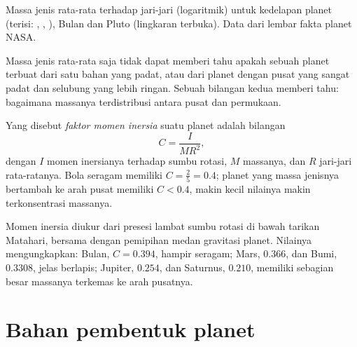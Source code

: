 \begin{omfigure}
{\small Massa jenis rata-rata terhadap jari-jari (logaritmik) untuk kedelapan planet (terisi: , , ), Bulan dan Pluto (lingkaran terbuka). Data dari lembar fakta planet NASA.}
\end{omfigure}

Massa jenis rata-rata saja tidak dapat memberi tahu apakah sebuah planet terbuat dari satu bahan yang padat, atau dari planet dengan pusat yang sangat padat dan selubung yang lebih ringan. Sebuah bilangan kedua memberi tahu: bagaimana massanya terdistribusi antara pusat dan permukaan.

\begin{definition}\label{def:b1:comparative-planetology:moi}
Yang disebut \emph{faktor momen inersia} suatu planet adalah bilangan
\[
  C = \frac{I}{MR^2} ,
\]
dengan $I$ momen inersianya terhadap sumbu rotasi, $M$ massanya, dan $R$ jari-jari rata-ratanya. Bola seragam memiliki $C = \tfrac25 = 0.4$; planet yang massa jenisnya bertambah ke arah pusat memiliki $C < 0.4$, makin kecil nilainya makin terkonsentrasi massanya.
\end{definition}

Momen inersia diukur dari presesi lambat sumbu rotasi di bawah tarikan Matahari, bersama dengan pemipihan medan gravitasi planet. Nilainya mengungkapkan: Bulan, $C = 0.394$, hampir seragam; Mars, $0.366$, dan Bumi, $0.3308$, jelas berlapis; Jupiter, $0.254$, dan Saturnus, $0.210$, memiliki sebagian besar massanya terkemas ke arah pusatnya.

\section{Bahan pembentuk planet}

